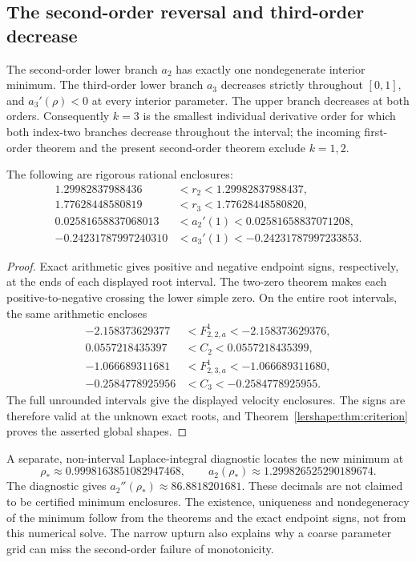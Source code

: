 \subsection{The second-order reversal and third-order decrease}

\begin{theorem}
\label{lershape:thm:k2k3}
The second-order lower branch $a_2$ has exactly one nondegenerate
interior minimum. The third-order lower branch $a_3$ decreases strictly
throughout $[0,1]$, and $a_3'(\rho)<0$ at every interior parameter.
The upper branch decreases at both orders. Consequently $k=3$ is the
smallest individual derivative order for which both index-two branches
decrease throughout the interval; the incoming first-order theorem and
the present second-order theorem exclude $k=1,2$.

The following are rigorous rational enclosures:
\begin{align*}
 1.29982837988436&<r_2<1.29982837988437,\\
 1.77628448580819&<r_3<1.77628448580820,\\
 0.02581658837068013&<a_2'(1)<0.02581658837071208,\\
 -0.24231787997240310&<a_3'(1)<-0.24231787997233853.
\end{align*}
\end{theorem}

\begin{proof}
Exact arithmetic gives positive and negative endpoint signs,
respectively, at the ends of each displayed root interval. The
two-zero theorem makes each positive-to-negative crossing the lower
simple zero. On the entire root intervals, the same arithmetic encloses
\begin{align*}
 -2.158373629377&<F_{2,2,a}^{1}<-2.158373629376,\\
 0.0557218435397&<C_2<0.0557218435399,\\
 -1.066689311681&<F_{2,3,a}^{1}<-1.066689311680,\\
 -0.2584778925956&<C_3<-0.2584778925955.
\end{align*}
The full unrounded intervals give the displayed velocity enclosures.
The signs are therefore valid at the unknown exact roots, and
Theorem~\ref{lershape:thm:criterion} proves the asserted global shapes.
\end{proof}

A separate, non-interval Laplace-integral diagnostic locates the new
minimum at
\[
 \rho_*\approx0.9998163851082947468,
 \qquad a_2(\rho_*)\approx1.299826525290189674.
\]
The diagnostic gives $a_2''(\rho_*)\approx86.8818201681$. These
decimals are not claimed to be certified minimum enclosures. The
existence, uniqueness and nondegeneracy of the minimum follow from the
theorems and the exact endpoint signs, not from this numerical solve.
The narrow upturn also explains why a coarse parameter grid can miss
the second-order failure of monotonicity.

